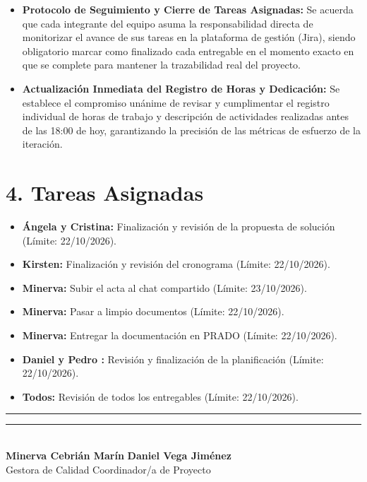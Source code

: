 \begin{itemize}
    \item \textbf{Protocolo de Seguimiento y Cierre de Tareas Asignadas:} 
    Se acuerda que cada integrante del equipo asuma la responsabilidad directa de monitorizar el avance de sus tareas en la plataforma de gestión (Jira), siendo obligatorio marcar como finalizado cada entregable en el momento exacto en que se complete para mantener la trazabilidad real del proyecto.

    \item \textbf{Actualización Inmediata del Registro de Horas y Dedicación:} 
    Se establece el compromiso unánime de revisar y cumplimentar el registro individual de horas de trabajo y descripción de actividades realizadas antes de las 18:00 de hoy, garantizando la precisión de las métricas de esfuerzo de la iteración.
\end{itemize}

\section*{4. Tareas Asignadas}
\begin{itemize}
    \item \textbf{Ángela y Cristina:} Finalización y revisión de la propuesta de solución (Límite: 22/10/2026).
     \item \textbf{Kirsten:} Finalización y revisión del cronograma (Límite: 22/10/2026).
    \item \textbf{Minerva:} Subir el acta al chat compartido (Límite: 23/10/2026).
    \item \textbf{Minerva:} Pasar a limpio documentos (Límite: 22/10/2026).
    \item \textbf{Minerva:} Entregar la documentación en PRADO (Límite: 22/10/2026).
     \item \textbf{Daniel y Pedro :} Revisión y finalización de la planificación (Límite: 22/10/2026).
    \item \textbf{Todos:} Revisión de todos los entregables (Límite: 22/10/2026).
\end{itemize}

\noindent
\rule{6cm}{0.4pt} \hfill \rule{6cm}{0.4pt}\\
\textbf{Minerva Cebrián Marín} \hfill \textbf{Daniel Vega Jiménez}\\
Gestora de Calidad \hfill Coordinador/a de Proyecto

